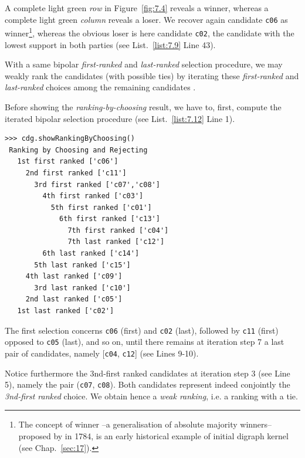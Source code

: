A complete light green \emph{row} in Figure~\vref{fig:7.4} reveals a \Condorcet winner, whereas a complete light green \emph{column} reveals a \Condorcet loser. We recover again candidate \texttt{c06} as \Condorcet winner\footnote{The concept of \Condorcet winner --a generalisation of absolute majority winners-- proposed by \Condorcet in 1784, is an early historical example of initial digraph kernel (see Chap.~\ref{sec:17}).}, whereas the obvious \Condorcet loser is here candidate \texttt{c02}, the candidate with the lowest support in both parties (see List.~\vref{list:7.9} Line 43).

With a same bipolar \emph{first-ranked} and \emph{last-ranked} selection procedure, we may weakly rank the candidates (with possible ties) by iterating these \emph{first-ranked} and \emph{last-ranked} choices among the remaining candidates \citep{BIS-1999}.

Before showing the \emph{ranking-by-choosing} result, we have to, first, compute the iterated bipolar selection procedure (see List.~\vref{list:7.12} Line 1).
\begin{lstlisting}[caption={Ranking by iterating choosing the \emph{first} and \emph{last} remaining candidates },label=list:7.12]
>>> cdg.showRankingByChoosing()
 Ranking by Choosing and Rejecting
   1st first ranked ['c06']
     2nd first ranked ['c11']
       3rd first ranked ['c07','c08']
         4th first ranked ['c03']
           5th first ranked ['c01']
             6th first ranked ['c13']
               7th first ranked ['c04']
               7th last ranked ['c12']
	     6th last ranked ['c14']
	   5th last ranked ['c15']
	 4th last ranked ['c09']
       3rd last ranked ['c10']
     2nd last ranked ['c05']
   1st last ranked ['c02']
\end{lstlisting}

The first selection concerns \texttt{c06} (first) and \texttt{c02} (last), followed by \texttt{c11} (first) opposed to \texttt{c05} (last), and so on, until there remains at iteration step 7 a last pair of candidates, namely [\texttt{c04}, \texttt{c12}] (see Lines 9-10).

Notice furthermore the 3nd-first ranked candidates at iteration step 3 (see Line 5), namely the pair (\texttt{c07}, \texttt{c08}). Both candidates represent indeed conjointly the \emph{3nd-first ranked} choice. We obtain hence a \emph{weak ranking}, i.e. a ranking with a tie.

